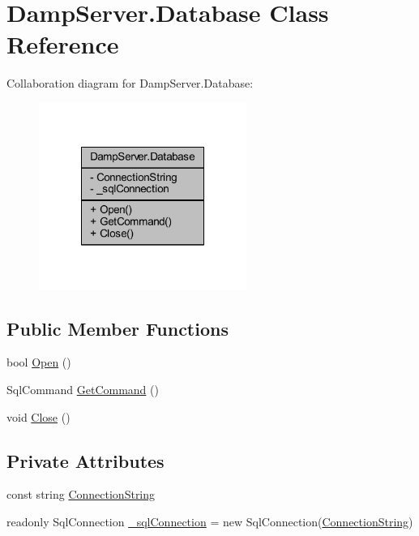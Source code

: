 \hypertarget{class_damp_server_1_1_database}{\section{Damp\-Server.\-Database Class Reference}
\label{class_damp_server_1_1_database}
}


Collaboration diagram for Damp\-Server.\-Database\-:
\nopagebreak
\begin{figure}[H]
\begin{center}
\leavevmode
\includegraphics[width=192pt]{class_damp_server_1_1_database__coll__graph}
\end{center}
\end{figure}
\subsection*{Public Member Functions}
\begin{DoxyCompactItemize}
\item 
bool \hyperlink{class_damp_server_1_1_database_a2e8871691086097ea7824bc7a43eb764}{Open} ()
\item 
Sql\-Command \hyperlink{class_damp_server_1_1_database_a1456ba3b264301c50f7d578f38692db0}{Get\-Command} ()
\item 
void \hyperlink{class_damp_server_1_1_database_a69af146e58e6594c5dec4246627172f6}{Close} ()
\end{DoxyCompactItemize}
\subsection*{Private Attributes}
\begin{DoxyCompactItemize}
\item 
const string \hyperlink{class_damp_server_1_1_database_a5231fd2642a827cc446f2b6c1692266a}{Connection\-String}
\item 
readonly Sql\-Connection \hyperlink{class_damp_server_1_1_database_ad5bbb40fda2c2880cd6fd08c184397f4}{\-\_\-sql\-Connection} = new Sql\-Connection(\hyperlink{class_damp_server_1_1_database_a5231fd2642a827cc446f2b6c1692266a}{Connection\-String})
\end{DoxyCompactItemize}


